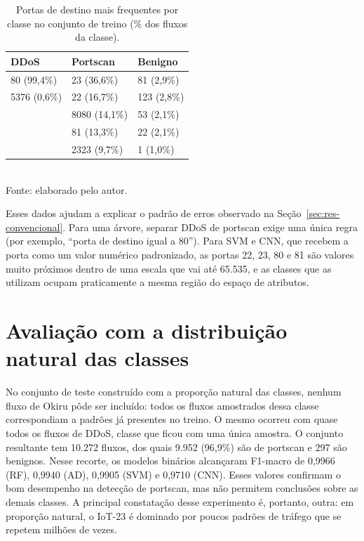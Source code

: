 \begin{table}[htbp]
\centering
\caption{Portas de destino mais frequentes por classe no conjunto de treino (\% dos fluxos da classe).}
\label{tab:portas-classe}
\begin{tabular}{lll}
\toprule
\textbf{DDoS} & \textbf{Portscan} & \textbf{Benigno} \\
\midrule
80 (99,4\%)  & 23 (36,6\%)   & 81 (2,9\%) \\
5376 (0,6\%) & 22 (16,7\%)   & 123 (2,8\%) \\
             & 8080 (14,1\%) & 53 (2,1\%) \\
             & 81 (13,3\%)   & 22 (2,1\%) \\
             & 2323 (9,7\%)  & 1 (1,0\%) \\
\bottomrule
\end{tabular}
\\[2pt]
\small{Fonte: elaborado pelo autor.}
\end{table}

Esses dados ajudam a explicar o padrão de erros observado na Seção~\ref{sec:res-convencional}. Para uma árvore, separar DDoS de portscan exige uma única regra (por exemplo, ``porta de destino igual a 80''). Para SVM e CNN, que recebem a porta como um valor numérico padronizado, as portas 22, 23, 80 e 81 são valores muito próximos dentro de uma escala que vai até 65.535, e as classes que as utilizam ocupam praticamente a mesma região do espaço de atributos.

\section{Avaliação com a distribuição natural das classes}
\label{sec:res-natural}

No conjunto de teste construído com a proporção natural das classes, nenhum fluxo de Okiru pôde ser incluído: todos os fluxos amostrados dessa classe correspondiam a padrões já presentes no treino. O mesmo ocorreu com quase todos os fluxos de DDoS, classe que ficou com uma única amostra. O conjunto resultante tem 10.272 fluxos, dos quais 9.952 (96,9\%) são de portscan e 297 são benignos. Nesse recorte, os modelos binários alcançaram F1-macro de 0,9966 (RF), 0,9940 (AD), 0,9905 (SVM) e 0,9710 (CNN). Esses valores confirmam o bom desempenho na detecção de portscan, mas não permitem conclusões sobre as demais classes. A principal constatação desse experimento é, portanto, outra: em proporção natural, o IoT-23 é dominado por poucos padrões de tráfego que se repetem milhões de vezes.

